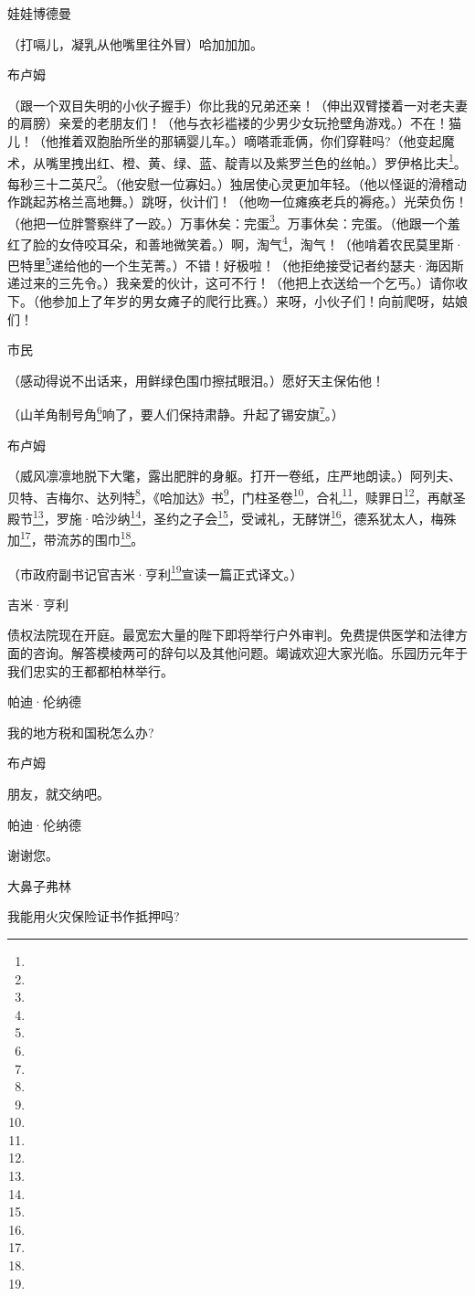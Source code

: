 \par 娃娃博德曼
\par （打嗝儿，凝乳从他嘴里往外冒）哈加加加。
\par 布卢姆
\par （跟一个双目失明的小伙子握手）你比我的兄弟还亲！（伸出双臂搂着一对老夫妻的肩膀）亲爱的老朋友们！（他与衣衫褴褛的少男少女玩抢壁角游戏。）不在！猫儿！（他推着双胞胎所坐的那辆婴儿车。）嘀嗒乖乖俩，你们穿鞋吗?（他变起魔术，从嘴里拽出红、橙、黄、绿、蓝、靛青以及紫罗兰色的丝帕。）罗伊格比夫\footnote{}。每秒三十二英尺\footnote{}。（他安慰一位寡妇。）独居使心灵更加年轻。（他以怪诞的滑稽动作跳起苏格兰高地舞。）跳呀，伙计们！（他吻一位瘫痪老兵的褥疮。）光荣负伤！（他把一位胖警察绊了一跤。）万事休矣：完蛋\footnote{}。万事休矣：完蛋。（他跟一个羞红了脸的女侍咬耳朵，和善地微笑着。）啊，淘气\footnote{}，淘气！（他啃着农民莫里斯·巴特里\footnote{}递给他的一个生芜菁。）不错！好极啦！（他拒绝接受记者约瑟夫·海因斯递过来的三先令。）我亲爱的伙计，这可不行！（他把上衣送给一个乞丐。）请你收下。（他参加上了年岁的男女瘫子的爬行比赛。）来呀，小伙子们！向前爬呀，姑娘们！
\par 市民
\par （感动得说不出话来，用鲜绿色围巾擦拭眼泪。）愿好天主保佑他！
\par （山羊角制号角\footnote{}响了，要人们保持肃静。升起了锡安旗\footnote{}。）
\par 布卢姆
\par （威风凛凛地脱下大氅，露出肥胖的身躯。打开一卷纸，庄严地朗读。）阿列夫、贝特、吉梅尔、达列特\footnote{}，《哈加达》书\footnote{}，门柱圣卷\footnote{}，合礼\footnote{}，赎罪日\footnote{}，再献圣殿节\footnote{}，罗施·哈沙纳\footnote{}，圣约之子会\footnote{}，受诫礼，无酵饼\footnote{}，德系犹太人，梅殊加\footnote{}，带流苏的围巾\footnote{}。
\par （市政府副书记官吉米·亨利\footnote{}宣读一篇正式译文。）
\par 吉米·亨利
\par 债权法院现在开庭。最宽宏大量的陛下即将举行户外审判。免费提供医学和法律方面的咨询。解答模棱两可的辞句以及其他问题。竭诚欢迎大家光临。乐园历元年于我们忠实的王都都柏林举行。
\par 帕迪·伦纳德
\par 我的地方税和国税怎么办?
\par 布卢姆
\par 朋友，就交纳吧。
\par 帕迪·伦纳德
\par 谢谢您。
\par 大鼻子弗林
\par 我能用火灾保险证书作抵押吗?

